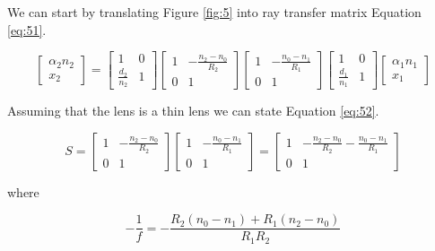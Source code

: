 \documentclass[main.tex]{subfiles}
\begin{document}
We can start by translating Figure \ref{fig:5} into ray transfer matrix Equation \ref{eq:51}.

\begin{equation}\label{eq:51}
\begin{bmatrix}
    \alpha_2 n_2 \\
    x_2
\end{bmatrix}
=
\begin{bmatrix}
    1                 &   0 \\
    \frac{d_2}{n_2}   &   1
\end{bmatrix}
\begin{bmatrix}
    1   & -\frac{n_2 - n_0}{R_2} \\
    0   &   1
\end{bmatrix}
\begin{bmatrix}
    1   & -\frac{n_0 - n_1}{R_1} \\
    0   &   1
\end{bmatrix}
\begin{bmatrix}
    1                 &   0 \\
    \frac{d_1}{n_1}   &   1
\end{bmatrix}
\begin{bmatrix}
    \alpha_{1}n_1  \\
    x_1
\end{bmatrix}
\end{equation}

Assuming that the lens is a thin lens we can state Equation \ref{eq:52}.

\begin{equation}\label{eq:52}
S
=
\begin{bmatrix}
    1   & -\frac{n_2 - n_0}{R_2} \\
    0   &   1
\end{bmatrix}
\begin{bmatrix}
    1   & -\frac{n_0 - n_1}{R_1} \\
    0   &   1
\end{bmatrix}
=
\begin{bmatrix}
    1   & -\frac{n_2 - n_0}{R_2} - \frac{n_0 - n_1}{R_1} \\
    0   &   1
\end{bmatrix}
\end{equation}

where

\begin{equation}\label{eq:53}
-\frac{1}{f} = -\frac{R_2(n_0 - n_1) + R_1(n_2 - n_0)}{R_1 R_2}
\end{equation}
\end{document}
